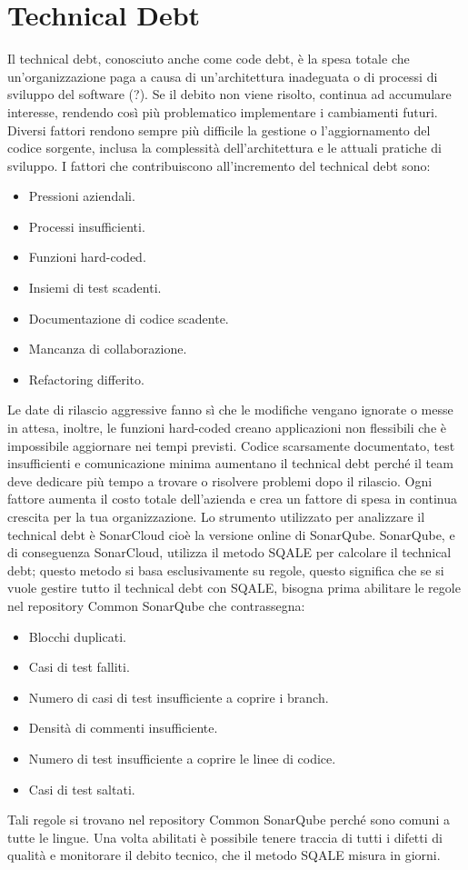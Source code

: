 \section{Technical Debt}
Il technical debt, conosciuto anche come code debt, è la spesa totale che un'organizzazione paga a causa di un'architettura inadeguata o di processi di sviluppo del software (?). Se il debito non viene risolto, continua ad accumulare interesse, rendendo così più problematico implementare i cambiamenti futuri. Diversi fattori rendono sempre più difficile la gestione o l'aggiornamento del codice sorgente, inclusa la complessità dell'architettura e le attuali pratiche di sviluppo. I fattori che contribuiscono all'incremento del technical debt sono:
\begin{itemize}
\item Pressioni aziendali.
\item Processi insufficienti.
\item Funzioni hard-coded.
\item Insiemi di test scadenti.
\item Documentazione di codice scadente.
\item Mancanza di collaborazione.
\item Refactoring differito.
\end{itemize}
Le date di rilascio aggressive fanno sì che le modifiche vengano ignorate o messe in attesa, inoltre, le funzioni hard-coded creano applicazioni non flessibili che è impossibile aggiornare nei tempi previsti. Codice scarsamente documentato, test insufficienti e comunicazione minima aumentano il technical debt perché il team deve dedicare più tempo a trovare o risolvere problemi dopo il rilascio. Ogni fattore aumenta il costo totale dell'azienda e crea un fattore di spesa in continua crescita per la tua organizzazione. Lo strumento utilizzato per analizzare il technical debt è SonarCloud cioè la versione online di SonarQube. SonarQube, e di conseguenza SonarCloud, utilizza il metodo SQALE per calcolare il technical debt; questo metodo si basa esclusivamente su regole, questo significa che se si vuole gestire tutto il technical debt con SQALE, bisogna prima abilitare le regole nel repository Common SonarQube che contrassegna:
\begin{itemize}
\item Blocchi duplicati.
\item Casi di test falliti.
\item Numero di casi di test insufficiente a coprire i branch.
\item Densità di commenti insufficiente.
\item Numero di test insufficiente a coprire le linee di codice.
\item Casi di test saltati.
\end{itemize}
Tali regole si trovano nel repository Common SonarQube perché sono comuni a tutte le lingue. Una volta abilitati è possibile tenere traccia di tutti i difetti di qualità e monitorare il debito tecnico, che il metodo SQALE misura in giorni.
